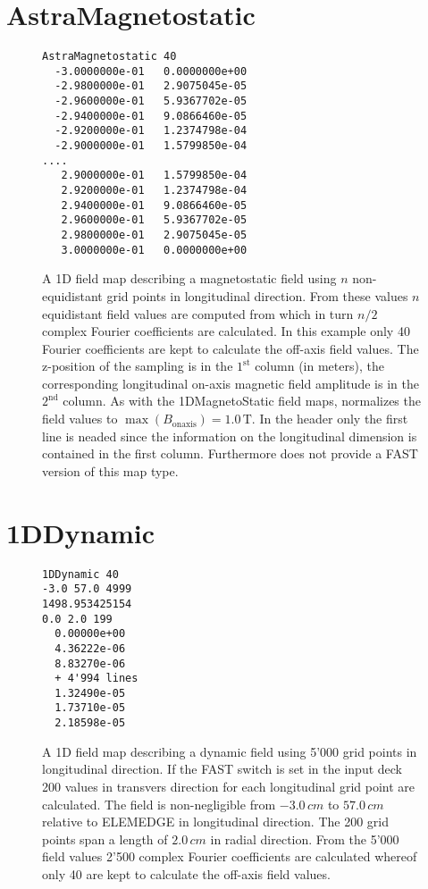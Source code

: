 \section{AstraMagnetostatic}
\label{sec: AstraMagnetostatic}
\begin{figure}[h]
\label{fig: AstraMagnetostatic}
\begin{fmpage}
\begin{verbatim}
AstraMagnetostatic 40
  -3.0000000e-01   0.0000000e+00
  -2.9800000e-01   2.9075045e-05
  -2.9600000e-01   5.9367702e-05
  -2.9400000e-01   9.0866460e-05
  -2.9200000e-01   1.2374798e-04
  -2.9000000e-01   1.5799850e-04
....
   2.9000000e-01   1.5799850e-04
   2.9200000e-01   1.2374798e-04
   2.9400000e-01   9.0866460e-05
   2.9600000e-01   5.9367702e-05
   2.9800000e-01   2.9075045e-05
   3.0000000e-01   0.0000000e+00
\end{verbatim}
\end{fmpage}
\caption[Example of an ASTRA compatible magnetostatic field map]{A 1D field map describing a magnetostatic field using $n$ non-equidistant grid points in longitudinal direction. From these values $n$ equidistant field values are computed from which in turn $n/2$ complex Fourier coefficients are calculated. In this example only 40 Fourier coefficients are kept to calculate the off-axis field values. The z-position of the sampling is in the $1^{\mathrm{st}}$ column (in meters), the corresponding longitudinal on-axis magnetic field amplitude is in the $2^{\mathrm{nd}}$ column. As with the 1DMagnetoStatic field maps, \opalt normalizes the field values to $\max(B_{\text{onaxis}}) = 1.0 \,\mathrm{T}$. In the header only the first line is neaded since the information on the longitudinal dimension is contained in the first column. Furthermore \opalt does not provide a FAST version of this map type.}
\end{figure}
\clearpage

\section{1DDynamic}
\label{sec:1DDynamic}
\begin{figure}[h]
\label{fig:1DDynamic}
\begin{fmpage}
\begin{verbatim}
1DDynamic 40
-3.0 57.0 4999
1498.953425154
0.0 2.0 199
  0.00000e+00
  4.36222e-06
  8.83270e-06
  + 4'994 lines
  1.32490e-05
  1.73710e-05
  2.18598e-05
\end{verbatim}
\end{fmpage}
\caption[Example of a 1DDynamic field map]{A 1D field map describing a dynamic field using 5'000 grid points in longitudinal direction. If the FAST switch is set in the input deck 200 values in transvers direction for each longitudinal grid point are calculated. The field is non-negligible from $-3.0\,cm$ to $57.0\,cm$ relative to ELEMEDGE in longitudinal direction. The 200 grid points span a length of $2.0\,cm$ in radial direction. From the 5'000 field values 2'500 complex Fourier coefficients are calculated whereof only 40 are kept to calculate the off-axis field values.}
\end{figure}
\clearpage

